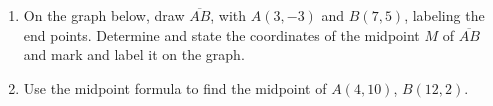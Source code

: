 \documentclass[12pt, twoside]{article}
\begin{document}
\begin{enumerate}
\item On the graph below, draw $\overline{AB}$, with $A(3,-3)$ and $B(7,5)$, labeling the end points. Determine and state the coordinates of the midpoint $M$ of $\overline{AB}$ and mark and label it on the graph.
  \begin{flushright}
  \end{flushright}

\item Use the midpoint formula to find the midpoint of $A(4,10)$, $B(12,2)$.

\end{enumerate}
\end{document}
